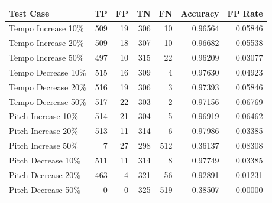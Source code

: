 \begin{table}[H]
    \begin{tabular}{|L|r|r|r|r|r|r|}
        \hline
        \vspace{5pt}\textbf{Test Case}\vspace{5pt}                  & \textbf{TP}   & \textbf{FP} & \textbf{TN} & \textbf{FN} & \textbf{Accuracy} & \textbf{FP Rate} \\ \hline
        Tempo Increase 10\%                & 509         & 19          & 306         & 10          & 0.96564           & 0.05846          \\ \hline
        Tempo Increase 20\%                & 509         & 18          & 307         & 10          & 0.96682           & 0.05538          \\ \hline
        Tempo Increase 50\%                & 497         & 10          & 315         & 22          & 0.96209           & 0.03077          \\ \hline
        Tempo Decrease 10\%                & 515         & 16          & 309         & 4           & 0.97630           & 0.04923          \\ \hline
        Tempo Decrease 20\%                & 516         & 19          & 306         & 3           & 0.97393           & 0.05846          \\ \hline
        Tempo Decrease 50\%                & 517         & 22          & 303         & 2           & 0.97156           & 0.06769          \\ \hline
        Pitch Increase 10\%                & 514         & 21          & 304         & 5           & 0.96919           & 0.06462          \\ \hline
        Pitch Increase 20\%                & 513         & 11          & 314         & 6           & 0.97986           & 0.03385          \\ \hline
        Pitch Increase 50\%                & 7           & 27          & 298         & 512         & 0.36137           & 0.08308          \\ \hline
        Pitch Decrease 10\%                & 511         & 11          & 314         & 8           & 0.97749           & 0.03385          \\ \hline
        Pitch Decrease 20\%                & 463         & 4           & 321         & 56          & 0.92891           & 0.01231          \\ \hline
        Pitch Decrease 50\%                & 0           & 0           & 325         & 519         & 0.38507           & 0.00000          \\ \hline

\end{tabular}
\end{table}

